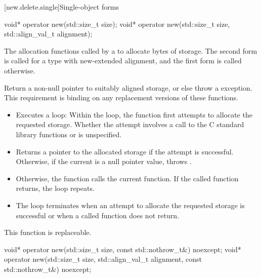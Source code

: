 [new.delete.single]{Single-object forms}

%
\begin{itemdecl}
void* operator new(std::size_t size);
void* operator new(std::size_t size, std::align_val_t alignment);
\end{itemdecl}

\begin{itemdescr}
\pnum
\effects
The
allocation functions
called by a
to allocate
 bytes of storage.
The second form is called for a type with new-extended alignment, and
the first form is called otherwise.

\pnum
\required
Return a non-null pointer to suitably aligned storage,
or else throw a
%
exception.
This requirement is binding on any replacement versions of these functions.

\pnum
{}

\begin{itemize}
\item
Executes a loop:
Within the loop, the function first attempts to allocate the requested storage.
Whether the attempt involves a call to the C standard library functions
 or 
is unspecified.
%
\item
Returns a pointer to the allocated storage if the attempt is successful.
Otherwise, if the
current  is
a null pointer value, throws
.
\item
Otherwise, the function calls the current
 function.
If the called function returns, the loop repeats.
\item
The loop terminates when an attempt to allocate the requested storage is
successful or when a called
function does not return.
\end{itemize}

\pnum
\remarks
This function is replaceable.
\end{itemdescr}

%
\begin{itemdecl}
void* operator new(std::size_t size, const std::nothrow_t&) noexcept;
void* operator new(std::size_t size, std::align_val_t alignment, const std::nothrow_t&) noexcept;
\end{itemdecl}

